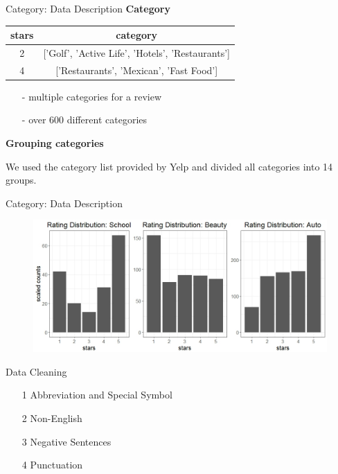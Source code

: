 \documentclass[10pt]{beamer}
\begin{document}
\begin{frame}{Category: Data Description}
\textbf{Category}

\begin{table}[]
\centering
\label{my-label}
\begin{tabular}{c|c}
\hline
stars & category          \\
\hline
2     & {[}'Golf', 'Active Life', 'Hotels', 'Restaurants'{]}    \\
\hline
4     & {[}'Restaurants', 'Mexican', 'Fast Food'{]} \\
\hline
\end{tabular}
\end{table}
\begin{itemize}
    \item[-] multiple categories for a review
    \item[-] over 600 different categories
\end{itemize}

\textbf{Grouping categories}

We used the category list provided by Yelp and divided all categories into 14 groups. 
\end{frame}

\begin{frame}{Category: Data Description}
\begin{figure}
    \centering
    \includegraphics[scale=0.42]{../image/cate.jpeg}
    
\end{figure}    
\end{frame}


\begin{frame}{Data Cleaning}


\begin{itemize}

	\item[1] Abbreviation and Special Symbol

	\item[2] Non-English

	\item[3] Negative Sentences
	
	\item[4] Punctuation

\end{itemize}

\end{frame}
\end{document}
